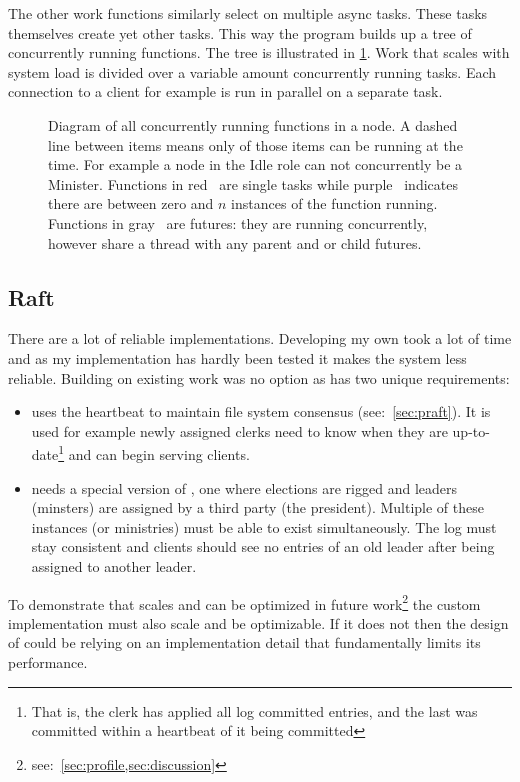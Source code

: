 The other work functions similarly select on multiple async tasks. These tasks themselves create yet other tasks. This way the program builds up a tree of concurrently running functions. The tree is illustrated in \cref{fig:tree}. Work that scales with system load is divided over a variable amount concurrently running tasks. Each connection to a client for example is run in parallel on a separate task.
%
\clearpage
\thispagestyle{empty}
\begin{figure}[htbp]
	\centering
	
	\caption{Diagram of all concurrently running functions in a node. A dashed line between items means only of those items can be running at the time. For example a node in the Idle role can not concurrently be a Minister. Functions in red~\taskLeg{} are single tasks while purple~\tasksLeg{} indicates there are between zero and $n$ instances of the function running. Functions in gray~\futureLeg{} are futures: they are running concurrently, however share a thread with any parent and or child futures.}
	\label{fig:tree}
\end{figure}
\clearpage

\subsection{Raft}
There are a lot of reliable \raft{} implementations. Developing my own took a lot of time and as my implementation has hardly been tested it makes the system less reliable. Building on existing work was no option as \name{} has two unique requirements: 
%
\begin{itemize}
	\item \Name{} uses the \raft{} heartbeat to maintain file system consensus (see:~\cref{sec:praft}). It is used for example newly assigned clerks need to know when they are up-to-date\footnote{That is, the clerk has applied all log committed entries, and the last was committed within a \raft{} heartbeat of it being committed} and can begin serving clients. 
	\item \Name{} needs a special version of \raft{}, one where elections are rigged and leaders (minsters) are assigned by a third party (the president). Multiple of these instances (or ministries) must be able to exist simultaneously. The log must stay consistent and clients should see no entries of an old leader after being assigned to another leader. 
\end{itemize}
%
To demonstrate that \name{} scales and can be optimized in future work\footnote{see:~\cref{sec:profile,sec:discussion}} the custom implementation must also scale and be optimizable. If it does not then the design of \name{} could be relying on an implementation detail that fundamentally limits its performance.
%
